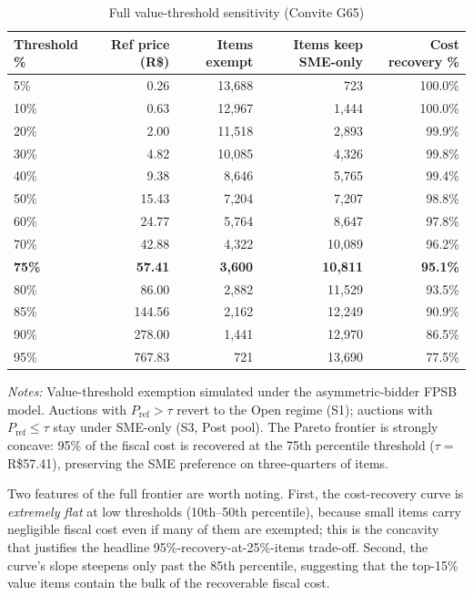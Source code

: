 \documentclass[12pt]{article}
\begin{document}
\begin{table}[htbp]
\centering
\caption{Full value-threshold sensitivity (Convite G65)}
\label{tab:vt-full}
\begin{threeparttable}
\small
\begin{tabular}{lrrrr}
\toprule
Threshold \% & Ref price (R\$) & Items exempt & Items keep SME-only &
 Cost recovery \% \\
\midrule
5\%   &  0.26   & 13{,}688 &    723 & 100.0\% \\
10\%  &  0.63   & 12{,}967 &  1{,}444 & 100.0\% \\
20\%  &  2.00   & 11{,}518 &  2{,}893 &  99.9\% \\
30\%  &  4.82   & 10{,}085 &  4{,}326 &  99.8\% \\
40\%  &  9.38   &  8{,}646 &  5{,}765 &  99.4\% \\
50\%  & 15.43   &  7{,}204 &  7{,}207 &  98.8\% \\
60\%  & 24.77   &  5{,}764 &  8{,}647 &  97.8\% \\
70\%  & 42.88   &  4{,}322 & 10{,}089 &  96.2\% \\
\textbf{75\%} & \textbf{57.41} & \textbf{3{,}600} &
 \textbf{10{,}811} & \textbf{95.1\%} \\
80\%  & 86.00   &  2{,}882 & 11{,}529 &  93.5\% \\
85\%  & 144.56  &  2{,}162 & 12{,}249 &  90.9\% \\
90\%  & 278.00  &  1{,}441 & 12{,}970 &  86.5\% \\
95\%  & 767.83  &    721   & 13{,}690 &  77.5\% \\
\bottomrule
\end{tabular}
\begin{tablenotes}
\footnotesize
\item \textit{Notes:} Value-threshold exemption simulated under
the asymmetric-bidder FPSB model. Auctions with $P_{\text{ref}}
> \tau$ revert to the Open regime (S1); auctions with
$P_{\text{ref}} \leq \tau$ stay under SME-only (S3, Post pool).
The Pareto frontier is strongly concave: 95\% of the fiscal cost
is recovered at the 75th percentile threshold ($\tau =$ R\$57.41),
preserving the SME preference on three-quarters of items.
\end{tablenotes}
\end{threeparttable}
\end{table}

Two features of the full frontier are worth noting. First, the
cost-recovery curve is \emph{extremely flat} at low thresholds
(10th--50th percentile), because small items carry negligible
fiscal cost even if many of them are exempted; this is the
concavity that justifies the headline 95\%-recovery-at-25\%-items
trade-off. Second, the curve's slope steepens only past the 85th
percentile, suggesting that the top-15\% value items contain the
bulk of the recoverable fiscal cost.
\end{document}
